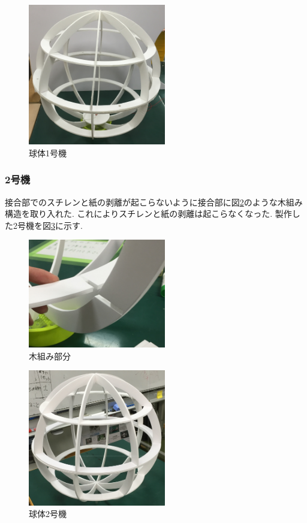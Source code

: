 \documentclass[12pt,oneside]{sotsuken_paper}
\begin{document}
\begin{figure}[htbp]
	\begin{center}
		\includegraphics[width=60mm]{image/sphere/sphere-1.jpg}
		\caption{球体1号機}
		\label{fig:sphere-1}
	\end{center}
\end{figure}

\subsubsection{2号機}
接合部でのスチレンと紙の剥離が起こらないように接合部に図\ref{fig:kigumi}のような木組み構造を取り入れた.
これによりスチレンと紙の剥離は起こらなくなった.
製作した2号機を図\ref{fig:sphere-2}に示す.

\begin{figure}[htbp]
	\begin{center}
		\includegraphics[width=60mm]{image/sphere/kigumi.jpg}
		\caption{木組み部分}
		\label{fig:kigumi}
	\end{center}
\end{figure}

\begin{figure}[htbp]
	\begin{center}
		\includegraphics[width=60mm]{image/sphere/sphere-2.jpg}
		\caption{球体2号機}
		\label{fig:sphere-2}
	\end{center}
\end{figure}
\end{document}
